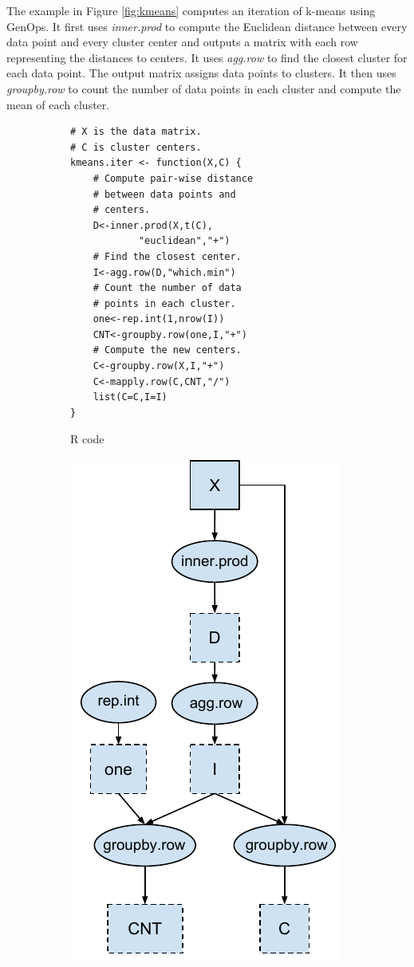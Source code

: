 The example in Figure \ref{fig:kmeans} computes an iteration of k-means
\cite{kmeans} using GenOps. It first uses \textit{inner.prod} to
compute the Euclidean distance between every data point and every cluster center
and outputs a matrix with each row representing the distances to centers.  
It uses \textit{agg.row} to find the closest
cluster for each data point.  The output matrix 
assigns data points to clusters. It then uses \textit{groupby.row} to count
the number of data points in each cluster and compute the mean of each cluster.

\begin{figure}
\centering
	\footnotesize
	\begin{subfigure}{.25\textwidth}
	\centering
	\begin{verbatim}
# X is the data matrix.
# C is cluster centers.
kmeans.iter <- function(X,C) {
	# Compute pair-wise distance
	# between data points and
	# centers.
	D<-inner.prod(X,t(C),
			"euclidean","+")
	# Find the closest center.
	I<-agg.row(D,"which.min")
	# Count the number of data
	# points in each cluster.
	one<-rep.int(1,nrow(I))
	CNT<-groupby.row(one,I,"+")
	# Compute the new centers.
	C<-groupby.row(X,I,"+")
	C<-mapply.row(C,CNT,"/")
	list(C=C,I=I)
}
	\end{verbatim}
  \vspace{-4pt}
	\label{fig:code}
		\caption{R code }
	\hspace{20pt}
	\end{subfigure}%
	\begin{subfigure}{.25\textwidth}
	\centering
	\includegraphics[scale=0.5]{FlashMatrix_figs/DAG.pdf}

\end{subfigure}
\end{figure}
